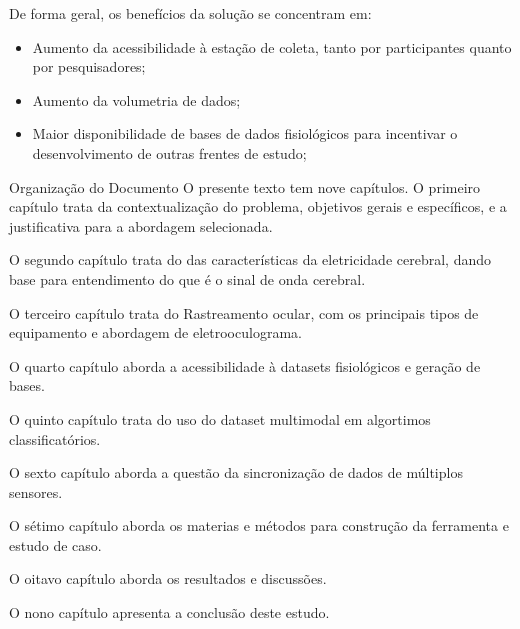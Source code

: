 \documentclass[a4paper, 12pt]{ppgeb}
\makeatletter
\renewcommand{\section}{\@startsection
{section}
{1}
{0mm}
{-\baselineskip}
{0.5\baselineskip}
{\large\bfseries\scshape}}
\makeatother
\begin{document}
De forma geral, os benefícios da solução se concentram em:
\begin{itemize}
    \item Aumento da acessibilidade à estação de coleta, tanto por participantes quanto por pesquisadores;
    \item Aumento da volumetria de dados;
    \item Maior disponibilidade de bases de dados fisiológicos para incentivar o desenvolvimento de outras frentes de estudo;
\end{itemize}


\section{Organização do Documento}
O presente texto tem nove capítulos. 
O primeiro capítulo trata da contextualização do problema, 
objetivos gerais e específicos, e a justificativa para a abordagem selecionada. 

O segundo capítulo trata do das características da eletricidade cerebral, dando base para entendimento do que é o sinal de onda
cerebral. 

O terceiro capítulo trata do 
Rastreamento ocular, com os principais tipos de equipamento e abordagem de eletrooculograma.

O quarto capítulo aborda a acessibilidade à datasets fisiológicos e geração de bases. 

O quinto capítulo trata do uso do dataset multimodal em algortimos classificatórios.

O sexto capítulo aborda a questão da sincronização de dados de múltiplos sensores. 

O sétimo capítulo aborda os materias e métodos para construção da ferramenta e estudo de caso.

O oitavo capítulo aborda os resultados e discussões.

O nono capítulo apresenta a conclusão deste estudo. 






%





\end{document}
